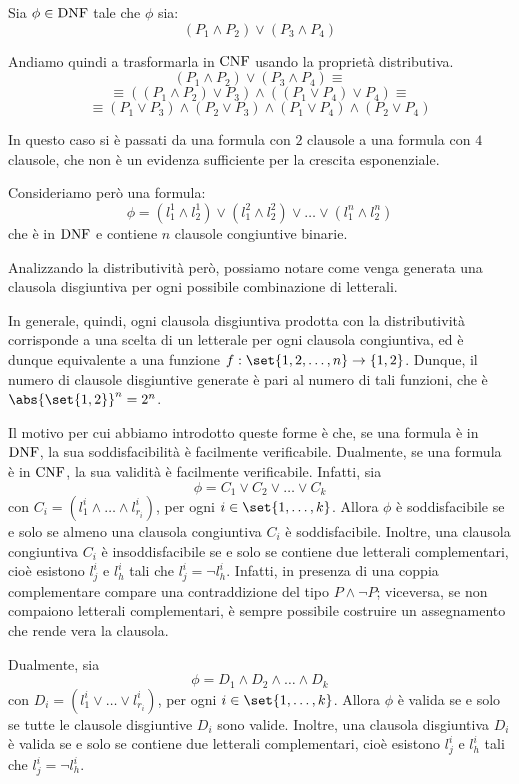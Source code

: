 \begin{example}{}
  Sia \(\phi \in\operatorname{DNF}\) tale che \(\phi\) sia:
  \[(P_1 \land P_2)\lor (P_3 \land P_4)\]

  Andiamo quindi a trasformarla in \(\operatorname{CNF}\) usando la proprietà distributiva.
  \[(P_1 \land P_2)\lor (P_3 \land P_4)\equiv\]
  \[\equiv ((P_1 \land P_2)\lor P_3)\land((P_1 \lor P_4)\lor P_4)\equiv\]
  \[\equiv (P_1 \lor P_3) \land (P_2 \lor P_3) \land (P_1 \lor P_4) \land (P_2 \lor P_4)\]

  In questo caso si è passati da una formula con \(2\) clausole a una formula con \(4\) clausole, che non è un evidenza sufficiente per la crescita esponenziale.

  Consideriamo però una formula:
  \[\phi = (l_1^1 \land l_2^1) \lor (l_1^2 \land l_2^2) \lor\ldots\lor (l_1^n \land l_2^n)\]
  che è in \(\operatorname{DNF}\) e contiene \(n\) clausole congiuntive binarie.

  Analizzando la distributività però, possiamo notare come venga generata una clausola disgiuntiva per ogni possibile combinazione di letterali.

  In generale, quindi, ogni clausola disgiuntiva prodotta con la distributività corrisponde a una scelta di un letterale per ogni clausola congiuntiva, ed è dunque equivalente a una funzione \(f:\set{1,2,\ldots,n} \to \{1,2\}\). Dunque, il numero di clausole disgiuntive generate è pari al numero di tali funzioni, che è \(\abs{\set{1,2}}^n = 2^n\).
\end{example}

Il motivo per cui abbiamo introdotto queste forme è che, se una formula è in \(\operatorname{DNF}\), la sua soddisfacibilità è facilmente verificabile. 
Dualmente, se una formula è in \(\operatorname{CNF}\), la sua validità è facilmente verificabile.
Infatti, sia
\[\phi = C_1 \lor C_2 \lor \ldots \lor C_k\]
con \(C_i = (l_1^i \land \ldots \land l_{r_i}^i)\), per ogni \(i \in \set{1,\ldots,k}\).
Allora \(\phi\) è soddisfacibile se e solo se almeno una clausola congiuntiva \(C_i\) è soddisfacibile.
Inoltre, una clausola congiuntiva \(C_i\) è insoddisfacibile se e solo se contiene due letterali complementari, cioè esistono \(l_j^i\) e \(l_h^i\) tali che \(l_j^i = \neg l_h^i\).
Infatti, in presenza di una coppia complementare compare una contraddizione del tipo \(P \land \neg P\); viceversa, se non compaiono letterali complementari, è sempre possibile costruire un assegnamento che rende vera la clausola.

Dualmente, sia
\[\phi = D_1 \land D_2 \land \ldots \land D_k\]
con \(D_i = (l_1^i \lor \ldots \lor l_{r_i}^i)\), per ogni \(i \in \set{1,\ldots,k}\).
Allora \(\phi\) è valida se e solo se tutte le clausole disgiuntive \(D_i\) sono valide.
Inoltre, una clausola disgiuntiva \(D_i\) è valida se e solo se contiene due letterali complementari, cioè esistono \(l_j^i\) e \(l_h^i\) tali che \(l_j^i = \neg l_h^i\).

